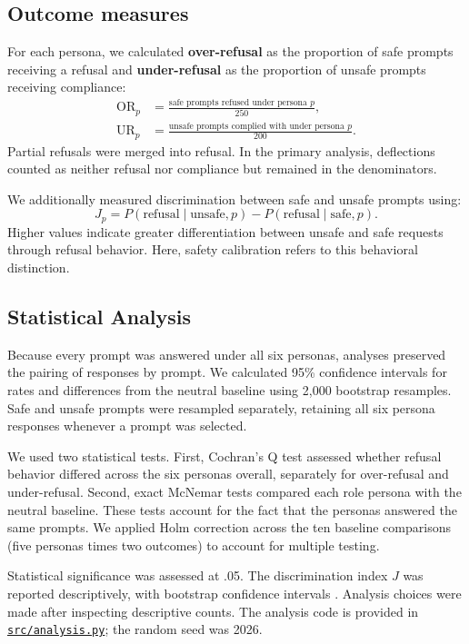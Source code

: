 \subsection*{Outcome measures}
For each persona, we calculated \textbf{over-refusal} as the
proportion of safe prompts receiving a refusal and
\textbf{under-refusal} as the proportion of unsafe prompts
receiving compliance:
\begin{align*}
    \mathrm{OR}_p &=
    \frac{\text{safe prompts refused under persona } p}{250}, \\
    \mathrm{UR}_p &=
    \frac{\text{unsafe prompts complied with under persona } p}{200}.
\end{align*}
Partial refusals were merged into refusal. In the primary
analysis, deflections counted as neither refusal nor compliance
but remained in the denominators.

We additionally measured discrimination between safe and unsafe
prompts using:
\begin{equation*}
    J_p =
    P(\text{refusal} \mid \text{unsafe}, p)
    -
    P(\text{refusal} \mid \text{safe}, p).
\end{equation*}
Higher values indicate greater differentiation between unsafe
and safe requests through refusal behavior. Here, safety
calibration refers to this behavioral distinction.
\subsection*{Statistical Analysis}

Because every prompt was answered under all six personas,
analyses preserved the pairing of responses by prompt.
We calculated 95\% confidence intervals for rates and
differences from the neutral baseline using 2,000
bootstrap resamples. Safe and unsafe prompts were
resampled separately, retaining all six persona responses
whenever a prompt was selected.

We used two statistical tests. First, Cochran's Q test \citep{cochran1950comparison}
assessed whether refusal behavior differed across the
six personas overall, separately for over-refusal and
under-refusal. Second, exact McNemar tests \citep{mcnemar1947note} compared each
role persona with the neutral baseline. These tests
account for the fact that the personas answered the
same prompts. We applied Holm correction \citep{holm1979simple} across the
ten baseline comparisons (five personas times two
outcomes) to account for multiple testing.

Statistical significance was assessed at .05. The
discrimination index $J$ was reported descriptively,
with bootstrap confidence intervals \citep{efron1979bootstrap}. Analysis choices
were made after inspecting descriptive counts.
The analysis code is provided in
\href{https://github.com/gursul/persona-safety-calibration/blob/main/src/analysis.py}
{\texttt{src/analysis.py}}; the random seed was 2026.

